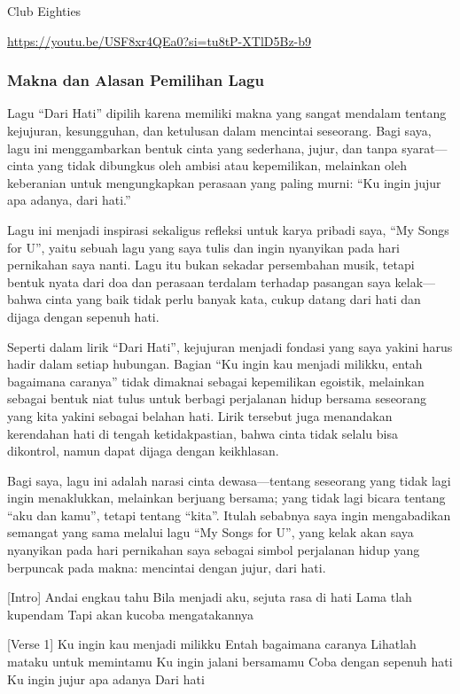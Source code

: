 \documentclass[
  letterpaper,
  DIV=11,
  numbers=noendperiod]{scrreprt}
\begin{document}
Club Eighties

\url{https://youtu.be/USF8xr4QEa0?si=tu8tP-XTlD5Bz-b9}

\subsubsection{Makna dan Alasan Pemilihan
Lagu}\label{makna-dan-alasan-pemilihan-lagu}

Lagu ``Dari Hati'' dipilih karena memiliki makna yang sangat mendalam
tentang kejujuran, kesungguhan, dan ketulusan dalam mencintai seseorang.
Bagi saya, lagu ini menggambarkan bentuk cinta yang sederhana, jujur,
dan tanpa syarat---cinta yang tidak dibungkus oleh ambisi atau
kepemilikan, melainkan oleh keberanian untuk mengungkapkan perasaan yang
paling murni: ``Ku ingin jujur apa adanya, dari hati.''

Lagu ini menjadi inspirasi sekaligus refleksi untuk karya pribadi saya,
``My Songs for U'', yaitu sebuah lagu yang saya tulis dan ingin
nyanyikan pada hari pernikahan saya nanti. Lagu itu bukan sekadar
persembahan musik, tetapi bentuk nyata dari doa dan perasaan terdalam
terhadap pasangan saya kelak---bahwa cinta yang baik tidak perlu banyak
kata, cukup datang dari hati dan dijaga dengan sepenuh hati.

Seperti dalam lirik ``Dari Hati'', kejujuran menjadi fondasi yang saya
yakini harus hadir dalam setiap hubungan. Bagian ``Ku ingin kau menjadi
milikku, entah bagaimana caranya'' tidak dimaknai sebagai kepemilikan
egoistik, melainkan sebagai bentuk niat tulus untuk berbagi perjalanan
hidup bersama seseorang yang kita yakini sebagai belahan hati. Lirik
tersebut juga menandakan kerendahan hati di tengah ketidakpastian, bahwa
cinta tidak selalu bisa dikontrol, namun dapat dijaga dengan keikhlasan.

Bagi saya, lagu ini adalah narasi cinta dewasa---tentang seseorang yang
tidak lagi ingin menaklukkan, melainkan berjuang bersama; yang tidak
lagi bicara tentang ``aku dan kamu'', tetapi tentang ``kita''. Itulah
sebabnya saya ingin mengabadikan semangat yang sama melalui lagu ``My
Songs for U'', yang kelak akan saya nyanyikan pada hari pernikahan saya
sebagai simbol perjalanan hidup yang berpuncak pada makna: mencintai
dengan jujur, dari hati.

{[}Intro{]} Andai engkau tahu Bila menjadi aku, sejuta rasa di hati Lama
tlah kupendam Tapi akan kucoba mengatakannya

{[}Verse 1{]} Ku ingin kau menjadi milikku Entah bagaimana caranya
Lihatlah mataku untuk memintamu Ku ingin jalani bersamamu Coba dengan
sepenuh hati Ku ingin jujur apa adanya Dari hati
\end{document}
